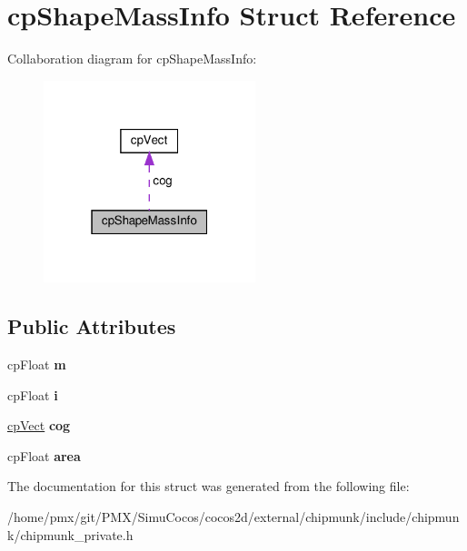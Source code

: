 \hypertarget{structcpShapeMassInfo}{}\section{cp\+Shape\+Mass\+Info Struct Reference}
\label{structcpShapeMassInfo}


Collaboration diagram for cp\+Shape\+Mass\+Info\+:
\nopagebreak
\begin{figure}[H]
\begin{center}
\leavevmode
\includegraphics[width=175pt]{structcpShapeMassInfo__coll__graph}
\end{center}
\end{figure}
\subsection*{Public Attributes}
\begin{DoxyCompactItemize}
\item 
\mbox{\label{structcpShapeMassInfo_a58bfe9fbe8e65d4c6d85e85239ed2949}} 
cp\+Float {\bfseries m}
\item 
\mbox{\label{structcpShapeMassInfo_aeafbe883d745085473803f94fcbbc4a6}} 
cp\+Float {\bfseries i}
\item 
\mbox{\label{structcpShapeMassInfo_ae030b38dca3b580d186f704b588dfb1a}} 
\hyperlink{structcpVect}{cp\+Vect} {\bfseries cog}
\item 
\mbox{\label{structcpShapeMassInfo_a9ca38a5d2d0a13fb72b64a18c8f9de01}} 
cp\+Float {\bfseries area}
\end{DoxyCompactItemize}


The documentation for this struct was generated from the following file\+:\begin{DoxyCompactItemize}
\item 
/home/pmx/git/\+P\+M\+X/\+Simu\+Cocos/cocos2d/external/chipmunk/include/chipmunk/chipmunk\+\_\+private.\+h\end{DoxyCompactItemize}
